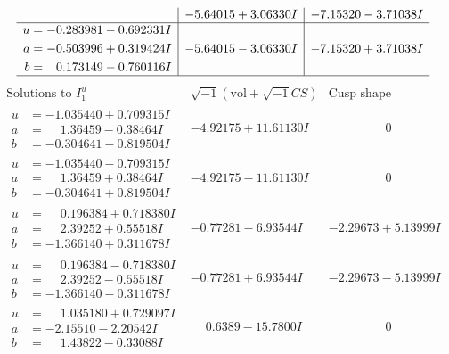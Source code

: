 \documentclass[1p]{elsarticle_modified}
\theoremstyle{definition}
\newcommand{\I}{\sqrt{-1}}
\begin{document}
$$\begin{array}{c|c|c}
 & -5.64015 + 3.06330 I & -7.15320 - 3.71038 I \\ \hline\begin{aligned}
u &= -0.283981 - 0.692331 I \\
a &= -0.503996 + 0.319424 I \\
b &= \phantom{-}0.173149 - 0.760116 I\end{aligned}
 & -5.64015 - 3.06330 I & -7.15320 + 3.71038 I\\
 \hline 
 \end{array}$$\newpage$$\begin{array}{c|c|c}  
\text{Solutions to }I^u_{1}& \I (\text{vol} + \sqrt{-1}CS) & \text{Cusp shape}\\
 \hline 
\begin{aligned}
u &= -1.035440 + 0.709315 I \\
a &= \phantom{-}1.36459 - 0.38464 I \\
b &= -0.304641 - 0.819504 I\end{aligned}
 & -4.92175 + 11.61130 I & \phantom{-0.000000 } 0 \\ \hline\begin{aligned}
u &= -1.035440 - 0.709315 I \\
a &= \phantom{-}1.36459 + 0.38464 I \\
b &= -0.304641 + 0.819504 I\end{aligned}
 & -4.92175 - 11.61130 I & \phantom{-0.000000 } 0 \\ \hline\begin{aligned}
u &= \phantom{-}0.196384 + 0.718380 I \\
a &= \phantom{-}2.39252 + 0.55518 I \\
b &= -1.366140 + 0.311678 I\end{aligned}
 & -0.77281 - 6.93544 I & -2.29673 + 5.13999 I \\ \hline\begin{aligned}
u &= \phantom{-}0.196384 - 0.718380 I \\
a &= \phantom{-}2.39252 - 0.55518 I \\
b &= -1.366140 - 0.311678 I\end{aligned}
 & -0.77281 + 6.93544 I & -2.29673 - 5.13999 I \\ \hline\begin{aligned}
u &= \phantom{-}1.035180 + 0.729097 I \\
a &= -2.15510 - 2.20542 I \\
b &= \phantom{-}1.43822 - 0.33088 I\end{aligned}
 & \phantom{-}0.6389 - 15.7800 I & \phantom{-0.000000 } 0 \\ \hline\begin{aligned}

\end{aligned}
\end{array}$$
\end{document}

